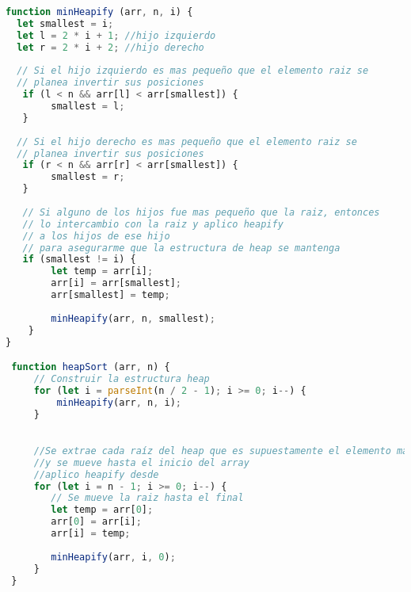 \begin{lstlisting}[language=JavaScript, caption=Heap sort]
function minHeapify (arr, n, i) {
  let smallest = i;
  let l = 2 * i + 1; //hijo izquierdo
  let r = 2 * i + 2; //hijo derecho
  
  // Si el hijo izquierdo es mas pequeño que el elemento raiz se
  // planea invertir sus posiciones
   if (l < n && arr[l] < arr[smallest]) {
        smallest = l; 
   }
  
  // Si el hijo derecho es mas pequeño que el elemento raiz se
  // planea invertir sus posiciones
   if (r < n && arr[r] < arr[smallest]) {
        smallest = r; 
   }
  
   // Si alguno de los hijos fue mas pequeño que la raiz, entonces
   // lo intercambio con la raiz y aplico heapify 
   // a los hijos de ese hijo
   // para asegurarme que la estructura de heap se mantenga
   if (smallest != i) { 
        let temp = arr[i]; 
        arr[i] = arr[smallest]; 
        arr[smallest] = temp; 
  
        minHeapify(arr, n, smallest); 
    } 
}

 function heapSort (arr, n) { 
     // Construir la estructura heap 
     for (let i = parseInt(n / 2 - 1); i >= 0; i--) {
         minHeapify(arr, n, i); 
     }

  
     //Se extrae cada raíz del heap que es supuestamente el elemento mas pequeño
     //y se mueve hasta el inicio del array
     //aplico heapify desde 
     for (let i = n - 1; i >= 0; i--) { 
        // Se mueve la raiz hasta el final
        let temp = arr[0]; 
        arr[0] = arr[i]; 
        arr[i] = temp; 
  
        minHeapify(arr, i, 0); 
     } 
 }
\end{lstlisting}